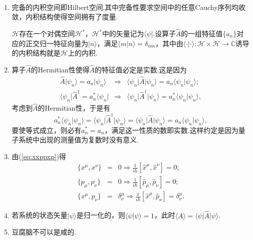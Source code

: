     \begin{remark}\ 
        \begin{enumerate}
            \item 完备的内积空间即Hilbert空间.其中完备性要求空间中的任意Cauchy序列均收敛，内积结构使得空间拥有了度量.
            
            $\mathcal{H}$存在一个对偶空间$\mathcal{H}^*$，$\mathcal{H}^*$中的矢量记为$\langle\psi\vert$.设算子$\hat{A}$的一组特征值$\{a_n\}$对应的正交归一特征向量为$\vert n\rangle $，满足$\langle m\vert n\rangle=\delta_{mn}$，其中由$\langle\cdot \vert\cdot\rangle:\mathcal{H}\times \mathcal{H}\rightarrow \mathbb{C} $诱导的内积结构就是$\mathcal{H}$上的内积.
            \item 算子$\hat{A}$的Hermitian性使得$\hat{A}$的特征值必定是实数.这是因为
            \begin{eqnarray*}
                \hat{A}\vert\psi_n\rangle=a_n\vert\psi_n\rangle&\Rightarrow&\langle\psi_n\vert\hat{A}\vert\psi_n\rangle=a_n\langle\psi_n\vert\psi_n\rangle;\\
                \langle\psi_n\vert\hat{A}^\dagger=a^*_n\langle\psi_n\vert&\Rightarrow&\langle\psi_n\vert\hat{A}^\dagger\vert\psi_n\rangle=a^*_n\langle\psi_n\vert\psi_n\rangle,
            \end{eqnarray*}
            考虑到$\hat{A}$的Hermitian性，于是有
            $$a^*_n\langle\psi_n\vert\psi_n\rangle=\langle\psi_n\vert\hat{A}^\dagger\vert\psi_n\rangle=\langle\psi_n\vert\hat{A}\vert\psi_n\rangle=a_n\langle\psi_n\vert\psi_n\rangle,$$
            要使等式成立，则必有$a^*_n=a_n$，满足这一性质的数即实数.这样约定是因为量子系统中出现的测量值为复数时没有意义.
            \item 由(\ref{eq:xxppxp})得
            \begin{eqnarray*}
                \{x^\mu,x^\nu\}&=&0\Rightarrow\frac{1}{i\hbar}[\hat{x}^\mu,\hat{x}^\nu]=0;\\
                \{p_\mu,p_\nu\}&=&0\Rightarrow\frac{1}{i\hbar}[\hat{p}_\mu,\hat{p}_\nu]=0;\\
                \{x^\mu,p_\nu\}&=&\delta^\mu_\nu\Rightarrow\frac{1}{i\hbar}[\hat{x}^\mu,\hat{p}_\nu]=\delta^\mu_\nu.
            \end{eqnarray*}
            \item 若系统的状态矢量$\vert\psi\rangle$是归一化的，则$\langle\psi\vert\psi\rangle=1$，此时$\langle A\rangle =\langle\psi\vert\hat{A}\vert\psi\rangle$.
            \item 豆腐脑不可以是咸的.
        \end{enumerate}
    \end{remark}

